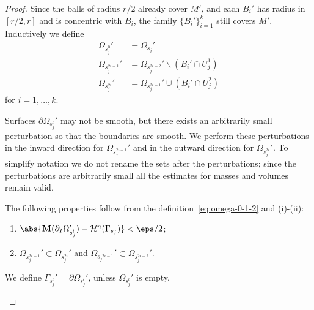\begin{lemma}
\begin{proof}
        Since the balls of radius $r/2$ already cover $M'$, and each $B_i'$ has radius in $[r/2,r]$ and is concentric with $B_i$, the family $\{B_i'\}_{i=1}^k$ still covers $M'$. Inductively we define
        \begin{equation}\label{eq:omega-0-1-2}
            \begin{split}
                \Omega_{s_j^0}' &= \Omega_{s_j}'\\
                \Omega_{s_j^{2i - 1}}' &= \Omega_{s_j^{2i - 2}}'\backslash (B_i'\cap U_j^1)\\
                \Omega_{s_j^{2i}}' &= \Omega_{s_j^{2i - 1}}'\cup(B_i'\cap U_j^2)
            \end{split}
        \end{equation}
        for $i = 1, \dots, k$.

        Surfaces $\partial\Omega_{s_j^l}'$ may not be smooth, but there exists an arbitrarily small perturbation so that the boundaries are smooth. We perform these perturbations in the inward direction for $\Omega_{s_j^{2i - 1}}'$ and in the outward direction for $\Omega_{s_j^{2i}}'$. To simplify notation we do not rename the sets after the perturbations; since the perturbations are arbitrarily small all the estimates for masses and volumes remain valid.

        The following properties follow from the definition~\ref{eq:omega-0-1-2} and (i)-(ii):
        \begin{enumerate}
            \item[(a)] $\abs{\mathbf{M}(\partial_I\Omega_{s_j^l}') - \mathcal{H}^n(\Gamma_{s_j})} < \eps/2$;
            \item[(b)] $\Omega_{s_j^{2i - 1}}' \subset \Omega_{s_j^{2i}}'$ and $\Omega_{{s_j}^{2i - 1}}' \subset \Omega_{{s_j^{2i - 2}}}'$.
        \end{enumerate}
        We define $\Gamma_{s_j^l}' = \partial\Omega_{s_j^l}'$, unless $\Omega_{s_j^l}'$ is empty.

        \begin{figure}[h]
            \centering
            \begin{tikzpicture}[scale=0.5]


\end{tikzpicture}
\end{figure}
\end{proof}
\end{lemma}
